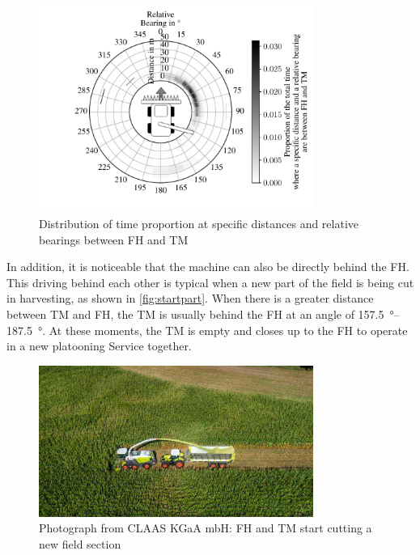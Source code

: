 \begin{figure}[H]
   \centering
   \includegraphics[width=0.8\textwidth]{figures/bearingHarvestScenario50.pdf}
   \caption{Distribution of time proportion at specific distances and relative bearings between \acf{FH} and \acf{TM}}%
   \label{fig:bearing}%
\end{figure}

In addition, it is noticeable that the machine can also be directly behind the \ac{FH}.
This driving behind each other is typical when a new part of the field is being cut in harvesting,
as shown in \autoref{fig:startpart}.
When there is a greater distance between \ac{TM} and \ac{FH}, the \ac{TM} is usually behind the FH at an angle of
\SIrange{157.5}{187.5}{\degree}.
At these moments, the \ac{TM} is empty and closes up to the \ac{FH} to operate in a new platooning Service together.

\begin{figure}[H]%
   \centering
   \includegraphics[width=0.8\textwidth]{figures/claas_harvest_behind}
   \caption{Photograph from CLAAS KGaA mbH: \acf{FH} and \acf{TM} start cutting a new field section}%
   \label{fig:startpart}%
\end{figure}

